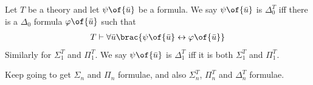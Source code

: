 \begin{boxdefinition}
    Let $T$ be a theory and let $\psi\of{\bar{u}}$ be a formula. We say $\psi\of{\bar{u}}$ is $\Delta_0^T$ iff there is a $\Delta_0$ formula $\varphi\of{\bar{u}}$ such that
    \begin{align*}
        T \vdash \forall \bar{u} \brac{\psi\of{\bar{u}} \leftrightarrow \varphi\of{\bar{u}}}
    \end{align*}
    Similarly for $\Sigma_1^T$ and $\Pi_1^T$. We say $\psi\of{\bar{u}}$ is $\Delta_1^T$ iff it is both $\Sigma_1^T$ and $\Pi_1^T$.
\end{boxdefinition}

Keep going to get $\Sigma_n$ and $\Pi_n$ formulae, and also $\Sigma_n^T$, $\Pi_n^T$ and $\Delta_n^T$ formulae. 